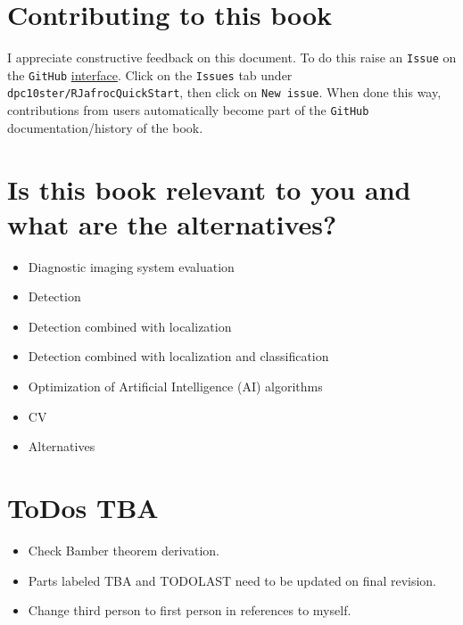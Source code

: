 \documentclass[
]{book}
\providecommand{\tightlist}{%
  \setlength{\itemsep}{0pt}\setlength{\parskip}{0pt}}
\begin{document}
\hypertarget{contributing-to-this-book}{%
\section*{Contributing to this book}\label{contributing-to-this-book}}

I appreciate constructive feedback on this document. To do this raise an \texttt{Issue} on the \texttt{GitHub} \href{https://github.com/dpc10ster/RJafrocQuickStart}{interface}. Click on the \texttt{Issues} tab under \texttt{dpc10ster/RJafrocQuickStart}, then click on \texttt{New\ issue}. When done this way, contributions from users automatically become part of the \texttt{GitHub} documentation/history of the book.

\hypertarget{is-this-book-relevant-to-you-and-what-are-the-alternatives}{%
\section*{Is this book relevant to you and what are the alternatives?}\label{is-this-book-relevant-to-you-and-what-are-the-alternatives}}

\begin{itemize}
\tightlist
\item
  Diagnostic imaging system evaluation
\item
  Detection
\item
  Detection combined with localization
\item
  Detection combined with localization and classification
\item
  Optimization of Artificial Intelligence (AI) algorithms
\item
  CV
\item
  Alternatives
\end{itemize}

\hypertarget{todos-tba}{%
\section*{ToDos TBA}\label{todos-tba}}

\begin{itemize}
\tightlist
\item
  Check Bamber theorem derivation.
\item
  Parts labeled TBA and TODOLAST need to be updated on final revision.
\item
  Change third person to first person in references to myself.
\end{itemize}
\end{document}
